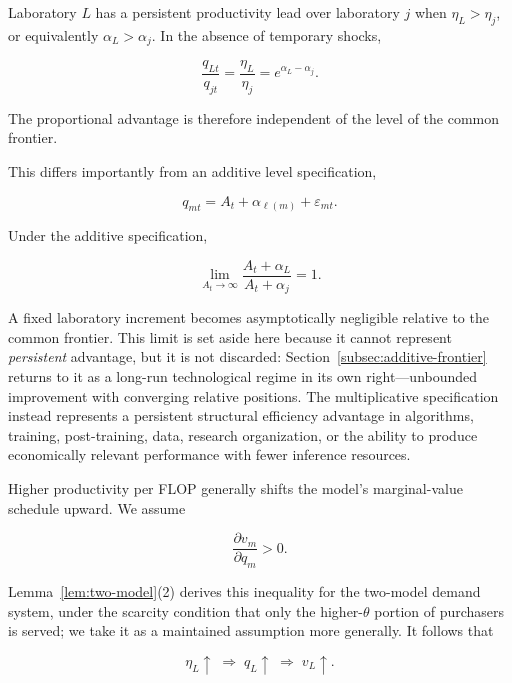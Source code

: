 \documentclass[11pt]{article}
\begin{document}
Laboratory $L$ has a persistent productivity lead over laboratory $j$ when $\eta_L>\eta_j$, or equivalently $\alpha_L>\alpha_j$. In the absence of temporary shocks,

\begin{equation}\frac{q_{Lt}}{q_{jt}}=\frac{\eta_L}{\eta_j}=e^{\alpha_L-\alpha_j}.\end{equation}

The proportional advantage is therefore independent of the level of the common frontier.

This differs importantly from an additive level specification,

\begin{equation}q_{mt}=A_t+\alpha_{\ell(m)}+\varepsilon_{mt}.\end{equation}

Under the additive specification,

\begin{equation}\lim_{A_t\rightarrow\infty}\frac{A_t+\alpha_L}{A_t+\alpha_j}=1.\end{equation}

A fixed laboratory increment becomes asymptotically negligible relative to the common frontier. This limit is set aside here because it cannot represent \emph{persistent} advantage, but it is not discarded: Section~\ref{subsec:additive-frontier} returns to it as a long-run technological regime in its own right---unbounded improvement with converging relative positions. The multiplicative specification instead represents a persistent structural efficiency advantage in algorithms, training, post-training, data, research organization, or the ability to produce economically relevant performance with fewer inference resources.

Higher productivity per FLOP generally shifts the model's marginal-value schedule upward. We assume

\begin{equation}\frac{\partial v_m}{\partial q_m}>0.\end{equation}

Lemma~\ref{lem:two-model}(2) derives this inequality for the two-model demand system, under the scarcity condition that only the higher-$\theta$ portion of purchasers is served; we take it as a maintained assumption more generally. It follows that

\begin{equation}\eta_L\uparrow\;\Longrightarrow\;q_L\uparrow\;\Longrightarrow\;v_L\uparrow.\end{equation}
\end{document}
